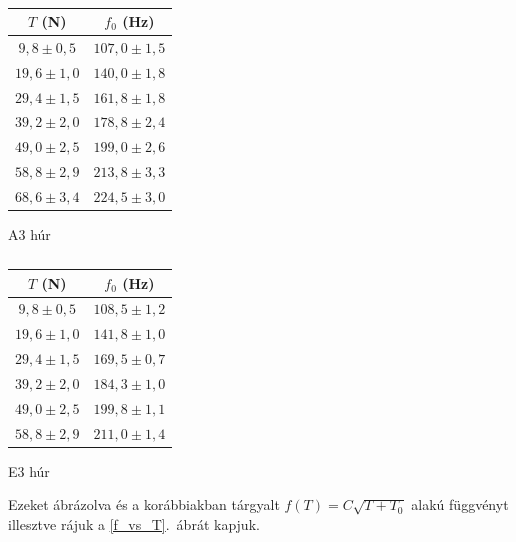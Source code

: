 \documentclass[a4paper,12pt]{article}
\begin{document}
\begin{table}[h!]
\centering
\begin{subtable}[t]{.5\linewidth}
\centering
\begin{tabular}{c | c}

$T$ (N) & $f_0$ (Hz) \\
\hline
 $9,8 \pm 0,5$ & $107,0 \pm 1,5$ \\
$19,6 \pm 1,0$ & $140,0 \pm 1,8$ \\
$29,4 \pm 1,5$ & $161,8 \pm 1,8$ \\
$39,2 \pm 2,0$ & $178,8 \pm 2,4$ \\
$49,0 \pm 2,5$ & $199,0 \pm 2,6$ \\
$58,8 \pm 2,9$ & $213,8 \pm 3,3$ \\
$68,6 \pm 3,4$ & $224,5 \pm 3,0$ \\

\end{tabular}
\caption{A3 húr}
\end{subtable}%
\begin{subtable}[t]{.5\linewidth}
\centering
\begin{tabular}{c | c}

$T$ (N) & $f_0$ (Hz) \\
\hline
 $9,8 \pm 0,5$ & $108,5 \pm 1,2$ \\
$19,6 \pm 1,0$ & $141,8 \pm 1,0$ \\
$29,4 \pm 1,5$ & $169,5 \pm 0,7$ \\
$39,2 \pm 2,0$ & $184,3 \pm 1,0$ \\
$49,0 \pm 2,5$ & $199,8 \pm 1,1$ \\
$58,8 \pm 2,9$ & $211,0 \pm 1,4$ \\

\end{tabular}
\caption{E3 húr}
\end{subtable}
\caption{}
\label{hur_eredmenyek}
\end{table}

Ezeket ábrázolva és a korábbiakban tárgyalt $f(T) = C \sqrt{T + T_0}$ alakú függvényt illesztve rájuk a \ref{f_vs_T}.\ ábrát kapjuk.
\end{document}
